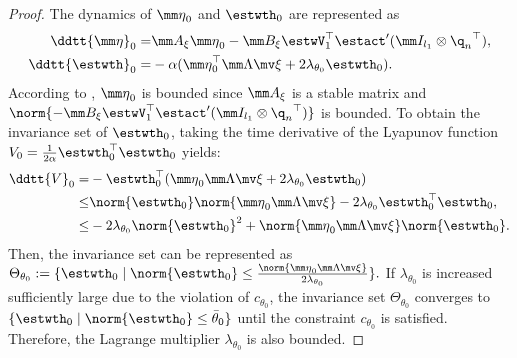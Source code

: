 \documentclass[letterpaper, 10 pt, conference]{ieeeconf}  %
\begin{document}
\begin{proof}
The dynamics of ${\mm \eta}_0$ and ${\estwth}_0$ are represented as
\begin{equation}
    \begin{aligned}     
        \ddtt{\mm \eta}_0 =& 
        \mm A_\xi{\mm \eta}_0 -\mm B_\xi 
        \estwV_1^\top \estact'(\mm I_{l_1}\otimes {\q_{n}}^\top )
        ,
        \\
        \ddtt{{\estwth}}_0
        =&
        -\alpha 
        (
            {\mm \eta}_0^\top \mm \Lambda\mv \xi+2\lambda_{\theta_0} {\estwth}_0
        )
        .
    \end{aligned}
\end{equation}
According to \cite[Chap.~4 T.~1.9]{Desoer:2009aa}, ${\mm \eta}_0$ is bounded since $\mm A_\xi$ is a stable matrix and $\norm{-\mm B_\xi\estwV_1^\top \estact'(\mm I_{l_1}\otimes {\q_{n}}^\top )}$ is bounded.
To obtain the invariance set of ${\estwth}_0$, taking the time derivative of the Lyapunov function $V_0=\tfrac{1}{2\alpha}{\estwth}_0^\top {\estwth}_0$ yields:
\begin{equation}
    \begin{aligned}
        \ddtt {V}_0 =& 
        -{\estwth}_0^\top (
            {\mm \eta}_0\mm \Lambda\mv \xi 
            +2\lambda_{\theta_0}{\estwth}_0
        )
        \\
        \le &
        \norm{{\estwth}_0} \norm{{\mm \eta}_0\mm \Lambda\mv \xi} 
        -
        2\lambda_{\theta_0} {\estwth}_0^\top {\estwth}_0
        ,
        \\
        \le &
        -2\lambda_{\theta_0} 
        \norm{{\estwth}_0}^2 
        + 
        \norm{{\mm \eta}_0\mm \Lambda\mv \xi}
        \norm{{\estwth}_0}
        .
    \end{aligned}
\end{equation}
Then, the invariance set can be represented as 
$
    \Theta_{{\theta}_0} :=
    \{
        {\estwth}_0\mid\norm{\estwth_0}
        \le
        \tfrac{
            \norm{{\mm \eta}_0\mm \Lambda\mv \xi}
        }{
            2\lambda_{\theta_0}
        }
    \}
    .    
$
If $\lambda_{\theta_0}$ is increased sufficiently large due to the violation of $c_{\theta_0}$, the invariance set $\Theta_{{\theta}_0}$ converges to $\{{\estwth}_0 \mid \norm{{\estwth}_0} \le \bar\theta_0\}$ until the constraint $c_{\theta_0}$ is satisfied.
Therefore, the Lagrange multiplier $\lambda_{\theta_0}$ is also bounded.

\end{proof}
\end{document}
